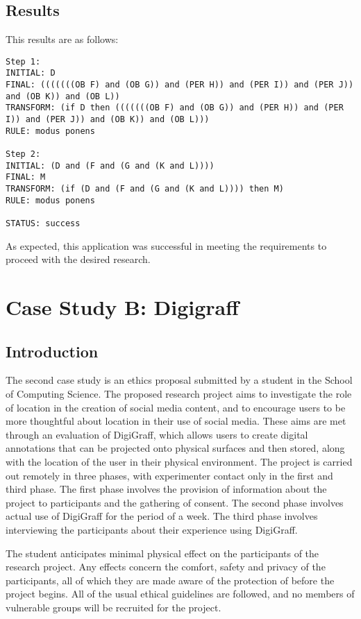 \documentclass{l4proj}
\begin{document}
\subsection{Results}
This results are as follows: 
\begin{verbatim}
Step 1: 
INITIAL: D
FINAL: (((((((OB F) and (OB G)) and (PER H)) and (PER I)) and (PER J)) and (OB K)) and (OB L))
TRANSFORM: (if D then (((((((OB F) and (OB G)) and (PER H)) and (PER I)) and (PER J)) and (OB K)) and (OB L)))
RULE: modus ponens

Step 2: 
INITIAL: (D and (F and (G and (K and L))))
FINAL: M
TRANSFORM: (if (D and (F and (G and (K and L)))) then M)
RULE: modus ponens

STATUS: success
\end{verbatim}

As expected, this application was successful in meeting the requirements to proceed with the desired research. 

\section{Case Study B: Digigraff}
\subsection{Introduction}
The second case study is an ethics proposal submitted by a student in the School of Computing Science. The proposed research project aims to investigate the role of location in the creation of social media content, and to encourage users to be more thoughtful about location in their use of social media. These aims are met through an evaluation of DigiGraff, which allows users to create digital annotations that can be projected onto physical surfaces and then stored, along with the location of the user in their physical environment. The project is carried out remotely in three phases, with experimenter contact only in the first and third phase. The first phase involves the provision of information about the project to participants and the gathering of consent. The second phase involves actual use of DigiGraff for the period of a week. The third phase involves interviewing the participants about their experience using DigiGraff. 

The student anticipates minimal physical effect on the participants of the research project. Any effects concern the comfort, safety and privacy of the participants, all of which they are made aware of the protection of before the project begins. All of the usual ethical guidelines are followed, and no members of vulnerable groups will be recruited for the project. 
\end{document}
